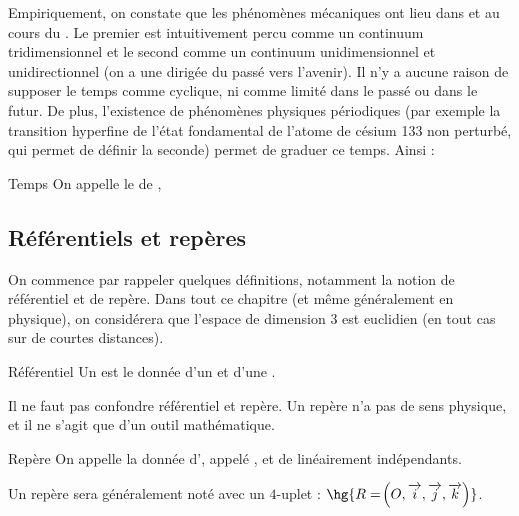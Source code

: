 \documentclass[a4paper,french,bookmarks]{book}
\begin{document}
    Empiriquement, on constate que les phénomènes mécaniques ont lieu dans  et au cours du . Le premier est intuitivement percu comme un continuum tridimensionnel et le second comme un continuum unidimensionnel et unidirectionnel (on a une  dirigée du passé vers l'avenir). Il n'y a  aucune raison de supposer le temps comme cyclique, ni comme limité dans le passé ou dans le futur. De plus, l'existence de phénomènes physiques périodiques (par exemple la transition hyperfine de l'état fondamental de l'atome de césium 133 non perturbé, qui permet de définir la seconde) permet de graduer ce temps. Ainsi :
    \begin{definition}{Temps}{}
        On appelle  le  de , 
    \end{definition}
    
    \subsection{Référentiels et repères}
    
    On commence par rappeler quelques définitions, notamment la notion de référentiel et de repère. Dans tout ce chapitre (et même généralement en physique), on considérera que l'espace de dimension $3$ est euclidien (en tout cas sur de courtes distances).
    
    \begin{definition}{Référentiel}{}
        Un  est le donnée d'un  et d'une .
    \end{definition}
    
    Il ne faut pas confondre référentiel et repère. Un repère n'a pas de sens physique, et il ne s'agit que d'un outil mathématique.
    
    \begin{definition}{Repère}{}
        On appelle  la donnée d', appelé , et de  linéairement indépendants.
    \end{definition}
    
    \begin{notation}
        Un repère  sera généralement noté avec un $4$-uplet : $\hg{R = \p{O, \vec i, \vec j, \vec k}}$.
    \end{notation}
    
\end{document}
